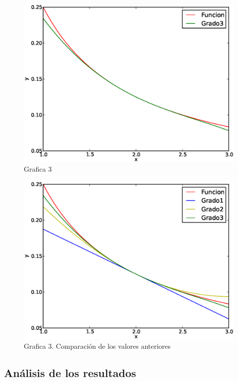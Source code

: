\documentclass[a4paper,12pt]{article}
\begin{document}
\begin{figure}[ht]
  \begin{center}
    \includegraphics[scale=.6]{cuarta.eps}
    \caption{Grafica 3} 
  \end{center}
\end{figure}
\newpage
\begin{figure}[ht]
  \begin{center}
    \includegraphics[scale=0.8]{sexta.eps}
    \caption{Grafica 3. Comparación de los valores anteriores} 
  \end{center}
\end{figure}


\newpage 


\subsection{Análisis de los resultados}
\end{document}
